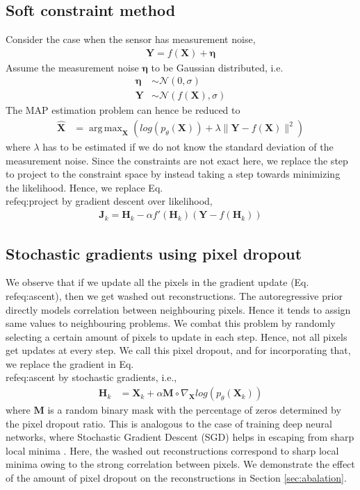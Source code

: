 \documentclass[journal,twoside]{IEEEtran}
\DeclareMathOperator*{\argmax}{arg\,max}
\newcommand{\X}{\mathbf{X}}
\newcommand{\Y}{\mathbf{Y}}
\begin{document}
\subsection{Soft constraint method}
\label{sec:soft_con}
Consider the case when the sensor has measurement noise,
\begin{align}
    \Y = f(\X) + \bm{\eta}
\end{align}
Assume the measurement noise $\bm{\eta}$ to be Gaussian distributed, i.e. 
\begin{align}
    \bm{\eta} &\sim \mathcal{N}(0,\sigma)\\
    \Y &\sim \mathcal{N}(f(\X),\sigma)
\end{align}
The MAP estimation problem can hence be reduced to 
\begin{align}
    \label{eq:proj_soft}
    \mathbf{\hat{X}} &= \argmax_{\X} ( log(p_{\theta}(\X)) + \lambda\| \Y - f(\X) \|^2 )
\end{align}
where $\lambda$ has to be estimated if we do not know the standard deviation of the measurement noise. Since the constraints are not exact here, we replace the step to project to the constraint space by instead taking a step towards minimizing the likelihood. Hence, we replace Eq.\\ref{eq:project} by gradient descent over likelihood, 
\begin{align}
    \mathbf{J}_k = \mathbf{H}_k - \alpha f'(\mathbf{H}_k) (\Y - f(\mathbf{H}_k))
\end{align}



\subsection{Stochastic gradients using pixel dropout}
\label{sec:stoch_grad}
We observe that if we update all the pixels in the gradient update (Eq.\\ref{eq:ascent}), then we get washed out reconstructions. The autoregressive prior directly models correlation between neighbouring pixels. Hence it tends to assign same values to neighbouring problems. We combat this problem by randomly selecting a certain amount of pixels to update in each step. Hence, not all pixels get updates at every step. We call this pixel dropout, and for incorporating that, we replace the gradient in Eq.\\ref{eq:ascent} by stochastic gradients, i.e.,
\begin{align}
\label{eq:dropout}
    \mathbf{H}_k &= \X_{k} + \alpha \mathbf{M} \circ \nabla_{\X} log(p_{\theta}(\X_k))
\end{align}
where  $\mathbf{M}$ is a random binary mask with the percentage of zeros determined by the pixel dropout ratio. This is analogous to the case of training deep neural networks, where Stochastic Gradient Descent (SGD) helps in escaping from sharp local minima \cite{keskar2016large}. Here, the washed out reconstructions correspond to sharp local minima owing to the strong correlation between pixels. We demonstrate the effect of the amount of pixel dropout on the reconstructions in Section \ref{sec:abalation}. 
\end{document}
